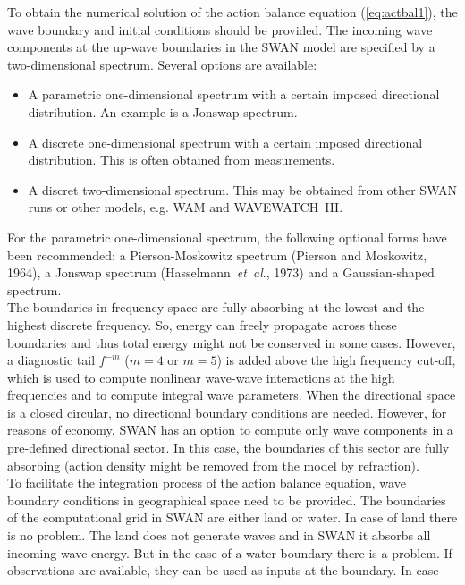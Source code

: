 \documentclass[12pt]{book}
\begin{document}
 \label{ch:bc}

To obtain the numerical solution of the action balance equation (\ref{eq:actbal1}), the wave boundary
and initial conditions should be provided. The incoming wave components at the up-wave
boundaries in the SWAN model are specified by a two-dimensional spectrum. Several
options are available:
\begin{itemize}
  \item A parametric one-dimensional spectrum with a certain imposed directional distribution.
        An example is a Jonswap spectrum.
  \item A discrete one-dimensional spectrum with a certain imposed directional distribution.
        This is often obtained from measurements.
  \item A discret two-dimensional spectrum. This may be obtained from other SWAN runs or other
        models, e.g. WAM and WAVEWATCH~III.
\end{itemize}
For the parametric one-dimensional spectrum, the following optional forms have been recommended:
a Pierson-Moskowitz spectrum (Pierson and Moskowitz, 1964), a Jonswap spectrum
(Hasselmann~{\it et~al}., 1973) and a Gaussian-shaped spectrum.
\\[2ex]
\noindent
The boundaries in frequency space are fully absorbing at the lowest and the highest discrete
frequency. So, energy can freely propagate across these boundaries and thus total energy
might not be conserved in some cases. However, a diagnostic tail $f^{-m}$ ($m=4$ or $m=5$)
is added above the high frequency cut-off, which is used to compute nonlinear wave-wave
interactions at the high frequencies and to compute integral wave parameters. When the directional
space is a closed circular, no directional boundary conditions are needed. However,
for reasons of economy, SWAN has an option to compute only wave components in a pre-defined
directional sector. In this case, the boundaries of this sector are fully absorbing (action
density might be removed from the model by refraction).
\\[2ex]
\noindent
To facilitate the integration process of the action balance equation, wave boundary conditions
in geographical space need to be provided. The boundaries of the computational grid in SWAN
are either land or water. In case of land there is no problem. The land does not generate waves
and in SWAN it absorbs all incoming wave energy. But in the case of a water boundary there is
a problem. If observations are available, they can be used as inputs at the boundary. In case
\end{document}
